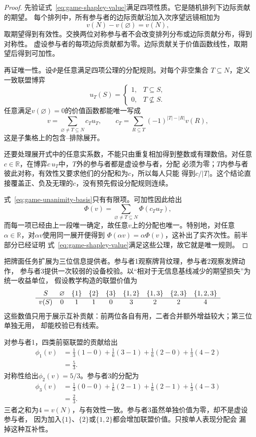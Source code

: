 \begin{proof}
先验证式~\eqref{eq:game-shapley-value}满足四项性质。它是随机排列下边际贡献的期望。
每个排列中，所有参与者的边际贡献沿加入次序望远镜相加为
\[
  v(N)-v(\varnothing)=v(N),
\]
取期望得到有效性。交换两位对称参与者不会改变排列分布或边际贡献分布，得到对称性。
虚设参与者的每项边际贡献都为零。边际贡献关于价值函数线性，取期望后得到可加性。

再证唯一性。设\(\Phi\)是任意满足四项公理的分配规则。对每个非空集合
\(T\subseteq N\)，定义一致联盟博弈
\[
  u_T(S)
  =
  \begin{cases}
    1,&T\subseteq S,\\
    0,&T\nsubseteq S.
  \end{cases}
\]
任意满足\(v(\varnothing)=0\)的价值函数都能唯一写成
\begin{equation}
  v
  =
  \sum_{\varnothing\neq T\subseteq N}
  c_Tu_T,
  \qquad
  c_T
  =
  \sum_{R\subseteq T}
  (-1)^{|T|-|R|}v(R),
  \label{eq:game-unanimity-basis}
\end{equation}
这是子集格上的包含--排除展开。

还要处理展开式中的任意实系数，不能只由重复相加得到整数或有理数倍。对任意
\(c\in\mathbb{R}\)，在博弈\(c\,u_T\)中，\(T\)外的参与者都是虚设参与者，分配
必须为零；\(T\)内参与者彼此对称，有效性又要求他们的分配和为\(c\)，所以每人只能
得到\(c/|T|\)。这个结论直接覆盖正、负及无理的\(c\)，没有预先假设分配规则连续。

式~\eqref{eq:game-unanimity-basis}只有有限项。可加性因此给出
\[
  \Phi(v)
  =
  \sum_{\varnothing\neq T\subseteq N}
  \Phi(c_Tu_T),
\]
而每一项已经由上一段唯一确定，故任意\(v\)上的分配也唯一。特别地，对任意
\(\alpha\in\mathbb{R}\)，对\(\alpha v\)使用同一展开便得到
\(\Phi(\alpha v)=\alpha\Phi(v)\)，这补出了实齐次性。前半部分已经证明
式~\eqref{eq:game-shapley-value}满足这些公理，故它就是唯一规则。
\end{proof}
把牌面任务扩展为三位信息提供者。参与者1观察牌背纹理，参与者2观察发牌动作，
参与者3提供一次较弱的设备校验。以“相对于无信息基线减少的期望损失”为统一收益单位，
假设教学构造的联盟价值为
\[
\begin{array}{c@{\quad}cccccccc}
  S
  &\varnothing&\{1\}&\{2\}&\{3\}
  &\{1,2\}&\{1,3\}&\{2,3\}&\{1,2,3\}\\ \hline
  v(S)
  &0&1&1&0&3&2&2&4
\end{array}
\]
这些数值只用于展示互补贡献：前两位各自有用，二者合并额外增益较大；第三位单独无用，
却能校验已有线索。

对参与者1，四类前驱联盟的贡献给出
\begin{align*}
  \phi_1(v)
  &=
  \frac13(1-0)
  +\frac16(3-1)
  +\frac16(2-0)
  +\frac13(4-2)\\
  &=\frac53.
\end{align*}
对称性给出\(\phi_2(v)=5/3\)。参与者3的分配为
\begin{align*}
  \phi_3(v)
  &=
  \frac13(0-0)
  +\frac16(2-1)
  +\frac16(2-1)
  +\frac13(4-3)\\
  &=\frac23.
\end{align*}
三者之和为\(4=v(N)\)，与有效性一致。参与者3虽然单独价值为零，却不是虚设参与者，
因为加入\(\{1\}\)、\(\{2\}\)或\(\{1,2\}\)都会增加联盟价值。只按单人表现分配会
漏掉这种互补性。

